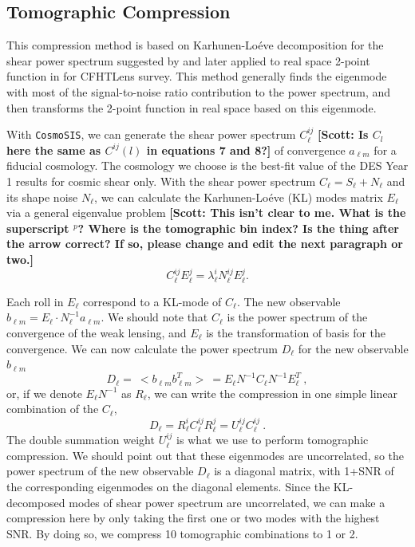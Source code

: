 \documentclass[twocolumn]{\docclass}
\newcommand\be{\begin{equation}}
\newcommand\ee{\end{equation}}
\newcommand\scott[1]{{\bf [Scott: #1]}}
\begin{document}
	\subsection{Tomographic Compression}
	
	This compression method is based on Karhunen-Lo\'eve decomposition for the shear power spectrum suggested by \citep{Alonso:2017hhj} and later applied to real space 2-point function in \citep{Bellini:2019ssw} for CFHTLens survey. This method generally finds the eigenmode with most of the signal-to-noise ratio contribution to the power spectrum, and then transforms the 2-point function in real space based on this eigenmode.
	
	With  {\tt CosmoSIS}, we can generate the shear power spectrum $C_{\ell}^{ij}$ \scott{Is $C_l$ here the same as $C^{ij}(l)$ in equations 7 and 8?} of convergence $a_{\ell m}$ for a fiducial cosmology. The cosmology we choose is the best-fit value of the DES Year 1 results for cosmic shear only. With the shear power spectrum $C_{\ell}=S_{\ell}+N_{\ell}$ and its shape noise $N_{\ell}$, we can calculate the Karhunen-Lo\'eve (KL) modes matrix $E_{\ell}$ via a general eigenvalue problem \scott{This isn't clear to me. What is the superscript $^p$? Where is the tomographic bin index? Is the thing after the arrow correct? If so, please change and edit the next paragraph or two.}
	\be
	C^{ij}_{\ell} E^j_{\ell} = \lambda^i_{\ell} N^{ij}_{\ell} E^j_{\ell}
	.\ee
	
	Each roll in $E_{\ell}$ correspond to a KL-mode of $C_{\ell}$. The new observable $b_{\ell m} = E_{\ell} \cdot N_{\ell}^{-1} a_{\ell m}$. We should note that $C_{\ell}$ is the power spectrum of the convergence of the weak lensing, and $E_{\ell}$ is the transformation of basis for the convergence. We can now calculate the power spectrum $D_{\ell}$ for the new observable $b_{\ell m}$ 
	\be
	D_{\ell} =\ <b_{\ell m} b_{\ell m}^T>\ = E_{\ell} N^{-1} C_{\ell} N^{-1} E^{T}_{\ell}\
	,\ee
	or, if we denote $E_{\ell} N^{-1}$ as $R_{\ell}$, we can write the compression in one simple linear combination of the $C_{\ell}$,
	\be
	D_{\ell} = R_{\ell}^i C_{\ell}^{ij} R_{\ell}^j = U_{\ell}^{ij} C_{\ell}^{ij}\
	.\ee
	The double summation weight $U_{\ell}^{ij}$ is what we use to perform tomographic compression. We should point out that these eigenmodes are uncorrelated, so the power spectrum of the new observable $D_{\ell}$ is a diagonal matrix, with 1+SNR of the corresponding eigenmodes on the diagonal elements. Since the KL-decomposed modes of shear power spectrum are uncorrelated, we can make a compression here by only taking the first one or two modes with the highest SNR. By doing so, we compress 10 tomographic combinations to 1 or 2.
	
\end{document}
